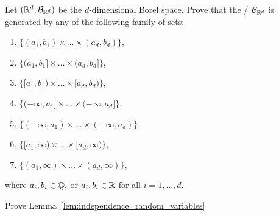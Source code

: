 \begin{problem}
Let $(\mathbb R^d, \mathcal B_{\mathbb R^d})$ be the $d$-dimensional Borel space. Prove that the \sigalg/ $\mathcal B_{\mathbb R^d}$ is generated by any of the following family of sets:
\begin{enumerate}[label={(\arabic*)}]
\item $\{(a_1, b_1) \times \dots \times (a_d,b_d)\}$,
\item $\{(a_1, b_1] \times \dots \times (a_d,b_d]\}$,
\item $\{[a_1, b_1) \times \dots \times [a_d,b_d)\}$,
\item $\{(-\infty,a_1] \times \dots \times (-\infty,a_d]\}$,
\item $\{(-\infty,a_1) \times \dots \times (-\infty, a_d)\}$,
\item $\{[a_1, \infty) \times \dots \times [a_d, \infty)\}$,
\item $\{(a_1,\infty) \times \dots \times (a_d, \infty)\}$,
\end{enumerate}
where $a_i, b_i \in \mathbb Q,$ or $a_i, b_i \in \mathbb R$ for all $i = 1, \dots, d$.
\end{problem}

\begin{problem}\label{prb:independence_random_variables}
Prove Lemma~\ref{lem:independence_random_variables}
\end{problem}
